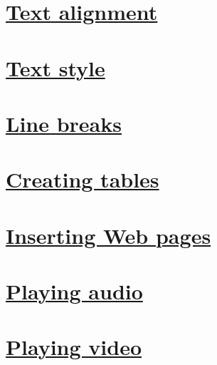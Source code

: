 

\chapter{\href{http://www.w3schools.com/cssref/pr_text_text-align.asp}{Text alignment}}



\chapter{\href{http://www.w3schools.com/html/html_formatting.asp}{Text style}}



\chapter{\href{http://www.w3schools.com/tags/tag_br.asp}{Line breaks}}



\chapter{\href{http://www.w3schools.com/html/html_tables.asp}{Creating tables}}



\chapter{\href{http://www.w3schools.com/html/html_iframe.asp}{Inserting Web pages}}



\chapter{\href{http://www.w3schools.com/tags/tag_audio.asp}{Playing audio}}



\chapter{\href{http://www.w3schools.com/tags/tag_video.asp}{Playing video}}

